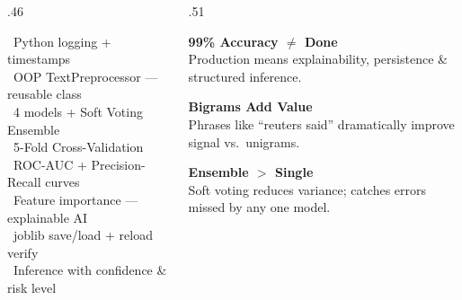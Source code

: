 \documentclass[aspectratio=169,10pt]{beamer}
\begin{document}
\begin{frame}[t]
\begin{columns}[T]
\begin{column}{.46\textwidth}
\begin{tcolorbox}[mycard={BlueMid}{ABlue},title={\footnotesize\textbf{Industrial Additions}},
      colbacktitle=NavyML,coltitle=white]
    \ Python logging + timestamps\\[1pt]
    \ OOP TextPreprocessor --- reusable class\\[1pt]
    \ 4 models + Soft Voting Ensemble\\[1pt]
    \ 5-Fold Cross-Validation\\[1pt]
    \ ROC-AUC + Precision-Recall curves\\[1pt]
    \ Feature importance --- explainable AI\\[1pt]
    \ joblib save/load + reload verify\\[1pt]
    \ Inference with confidence \& risk level
  \end{tcolorbox}
\end{column}
\begin{column}{.51\textwidth}
  \begin{tcolorbox}[mycard={ATeal}{ATeal},title={\footnotesize\textbf{Key Learnings}},
      colbacktitle=ATeal,coltitle=white]
    \begin{tcolorbox}[sideline={ABlue},top=2pt,bottom=2pt]
      {\footnotesize\textbf{\color{ABlue}99\% Accuracy $\neq$ Done}}\\
      {\tiny\color{Slate}Production means explainability, persistence \& structured inference.}
    \end{tcolorbox}\vspace{2pt}
    \begin{tcolorbox}[sideline={AGreen},top=2pt,bottom=2pt]
      {\footnotesize\textbf{\color{AGreen}Bigrams Add Value}}\\
      {\tiny\color{Slate}Phrases like ``reuters said'' dramatically improve signal vs.\ unigrams.}
    \end{tcolorbox}\vspace{2pt}
    \begin{tcolorbox}[sideline={AOrange},top=2pt,bottom=2pt]
      {\footnotesize\textbf{\color{AOrange}Ensemble $>$ Single}}\\
      {\tiny\color{Slate}Soft voting reduces variance; catches errors missed by any one model.}
    \end{tcolorbox}\vspace{2pt}
    \begin{tcolorbox}[sideline={APurple},top=2pt,bottom=2pt]

\end{tcolorbox}
\end{tcolorbox}
\end{column}
\end{columns}
\end{frame}
\end{document}
